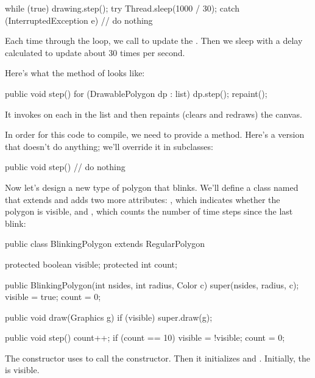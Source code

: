\begin{code}
while (true) {
    drawing.step();
    try {
        Thread.sleep(1000 / 30);
    } catch (InterruptedException e) {
        // do nothing
    }
}
\end{code}

Each time through the loop, we call  to update the .
Then we sleep with a delay calculated to update about 30 times per second.

Here's what the  method of  looks like:

\begin{code}
public void step() {
    for (DrawablePolygon dp : list) {
        dp.step();
    }
    repaint();
}
\end{code}

It invokes  on each  in the list and then repaints (clears and redraws) the canvas.

In order for this code to compile, we need  to provide a  method.
Here's a version that doesn't do anything; we'll override it in subclasses:

\begin{code}
public void step() {
    // do nothing
}
\end{code}

Now let's design a new type of polygon that blinks.
We'll define a class named  that extends  and adds two more attributes: , which indicates whether the polygon is visible, and , which counts the number of time steps since the last blink:

\begin{code}
public class BlinkingPolygon extends RegularPolygon {
    protected boolean visible;
    protected int count;

    public BlinkingPolygon(int nsides, int radius, Color c) {
        super(nsides, radius, c);
        visible = true;
        count = 0;
    }

    public void draw(Graphics g) {
        if (visible) {
            super.draw(g);
        }
    }

    public void step() {
        count++;
        if (count == 10) {
            visible = !visible;
            count = 0;
        }
    }
}
\end{code}

The constructor uses  to call the  constructor.
Then it initializes  and .
Initially, the  is visible.


